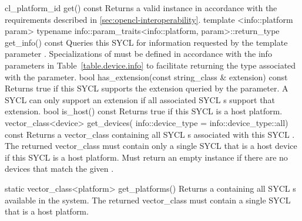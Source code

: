   \addRow
    {cl_platform_id get() const}
    {  
      Returns a valid  instance in accordance with the requirements described in \ref{sec:opencl-interoperability}.    
    }
  \addRowThreeL
    {template <info::platform param>}
    {  typename info::param_traits<info::platform, param>::return_type}
    {  get_info() const}
    {
      Queries this SYCL  for information requested by the template parameter .
      Specializations of  must be defined in accordance with the info parameters in Table~\ref{table.device.info} to facilitate returning the type associated with the  parameter.
    }
  \addRow
    {bool has_extension(const string_class \& extension) const}
    {
      Returns true if this SYCL  supports the extension queried by the  parameter. A SYCL  can only support an extension if all associated SYCL s support that extension.
    }
  \addRow
    {bool is_host() const}
    {
      Returns true if this SYCL  is a host platform.
    }
  \addRowTwoL
    {vector_class<device> get_devices(}
    {  info::device_type = info::device_type::all) const}
    {
      Returns a vector_class containing all SYCL s associated with this SYCL . The returned vector_class must contain only a single SYCL  that is a host device if this SYCL  is a host platform.
      Must return an empty  instance if there are no
      devices that match the given .
    }
\completeTable

  \addRow
    {static vector_class<platform> get_platforms()}
    {
      Returns a  containing all SYCL s available in the system. The returned vector_class must contain a single SYCL  that is a host platform.
    }
\completeTable

